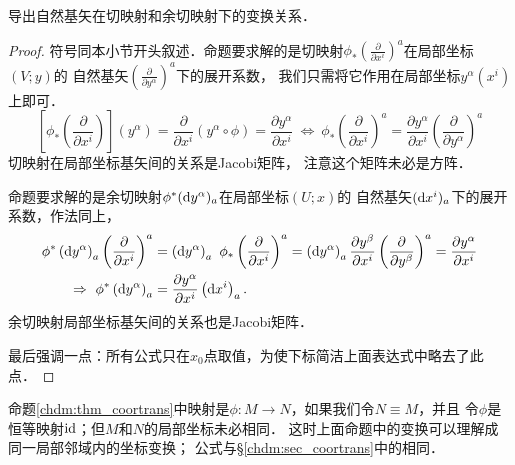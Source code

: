 \begin{proposition}\label{chdm:thm_coortrans}
    导出自然基矢在切映射和余切映射下的变换关系．
\end{proposition}
\begin{proof}
符号同本小节开头叙述．命题要求解的是切映射$\phi_{*}(\frac{\partial}{\partial x^i})^a$在局部坐标$(V;y)$的
自然基矢$(\frac{\partial}{\partial y^\alpha})^a$下的展开系数，
我们只需将它作用在局部坐标$y^\alpha(x^i)$上即可．
\setlength{\mathindent}{0em}
\begin{equation}\label{chdm:eqn_push-bases}
    \left[\phi_{*}\left(\frac{\partial}{\partial x^i}\right)\right] (y^\alpha) 
    =\frac{\partial}{\partial x^i} \left(y^\alpha \circ \phi \right) 
    =\frac{\partial y^\alpha}{\partial x^i} 
    \ \Leftrightarrow\ \phi_{*}
    \left(\frac{\partial}{\partial x^i}\right)^a = \frac{\partial y^\alpha}{\partial x^i}
    \left(\frac{\partial}{\partial y^\alpha}\right)^a 
\end{equation}\setlength{\mathindent}{2em}
切映射在局部坐标基矢间的关系是Jacobi矩阵，
注意这个矩阵未必是方阵．

命题要求解的是余切映射${\phi ^*}( {\rm{d}}{y^\alpha } )_a$在局部坐标$(U;x)$的
自然基矢$({\rm{d}}{x^i })_a$下的展开系数，作法同上，
\begin{align}
    {\phi ^*}\left( {{\rm{d}}{y^\alpha }} \right)_a 
    \left(\frac{\partial}{\partial x^i}\right) ^a 
    &= \left( {{\rm{d}}{y^\alpha }} \right)_a \ {\phi _*}
    \left(\frac{\partial}{\partial x^i}\right) ^a 
    = \left( {{\rm{d}}{y^\alpha }} \right)_a 
    \frac{\partial y^\beta}{\partial x^i}
    \left(\frac{\partial}{\partial y^\beta}\right)^a
    = \frac{{\partial {y^\alpha }}}{{\partial {x^i}}} \notag \\
    \Rightarrow \ 
    {\phi ^*}\left( {{\rm{d}}{y^\alpha }} \right)_a &=
     \frac{{\partial {y^\alpha }}}{{\partial {x^i}}} 
     \left( {{\rm{d}}{x^i }} \right)_a  . \label{chdm:eqn_pull-bases}
\end{align}
余切映射局部坐标基矢间的关系也是Jacobi矩阵．

最后强调一点：所有公式只在$x_0$点取值，为使下标简洁上面表达式中略去了此点．
\end{proof}

命题\ref{chdm:thm_coortrans}中映射是$\phi:M\to N$，如果我们令$N\equiv M$，并且
令$\phi$是恒等映射${\rm id}$；但$M$和$N$的局部坐标未必相同．
这时上面命题中的变换可以理解成同一局部邻域内的{\kaishu 坐标变换}；
公式与\S\ref{chdm:sec_coortrans}中的相同．

